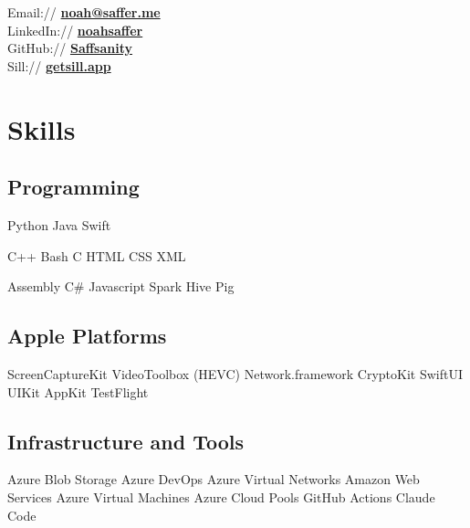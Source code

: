 \documentclass[letterpaper]{deedy-resume} %
\begin{document}
\begin{minipage}[t]{0.33\textwidth}
Email:// \href{mailto:noah@saffer.me}{\bf noah@saffer.me} \\
LinkedIn:// \href{https://www.linkedin.com/in/noahsaffer}{\bf noahsaffer} \\
GitHub:// \href{https://github.com/Saffsanity}{\bf Saffsanity} \\
Sill:// \href{https://getsill.app}{\bf getsill.app}

\sectionspace %


\section{Skills}

\subsection{Programming}


Python \textbullet{} Java \textbullet{} Swift \\


C++ \textbullet{} Bash \textbullet{} C \textbullet{}  HTML \textbullet{} CSS \textbullet{} XML \\


Assembly \textbullet{} C\# \textbullet{} Javascript \textbullet{} Spark \textbullet{} Hive \textbullet{} Pig

\vspace{10 pt}

\subsection{Apple Platforms}
ScreenCaptureKit \textbullet{} VideoToolbox (HEVC) \textbullet{} Network.framework \textbullet{} CryptoKit \textbullet{} SwiftUI \textbullet{} UIKit \textbullet{} AppKit \textbullet{} TestFlight

\vspace{10 pt}

\subsection{Infrastructure and Tools}
Azure Blob Storage \textbullet{} Azure DevOps \textbullet{} Azure Virtual Networks \textbullet{} Amazon Web Services \textbullet{} Azure Virtual Machines \textbullet{} Azure Cloud Pools \textbullet{} GitHub Actions \textbullet{} Claude Code


\end{minipage}
\end{document}
